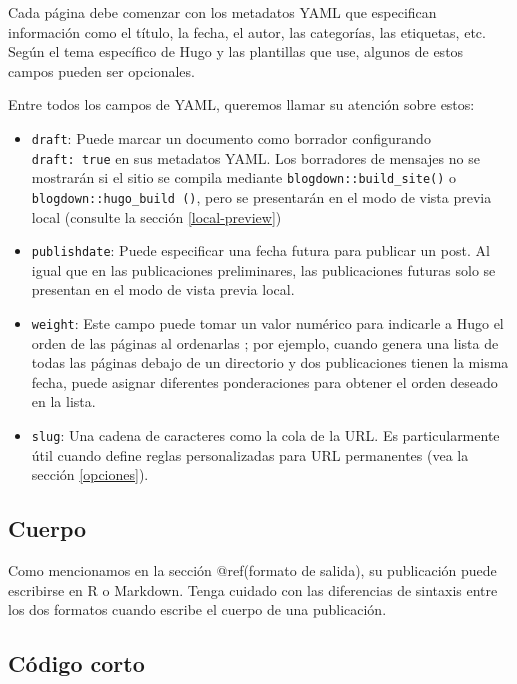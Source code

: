 \documentclass[12pt,]{krantz}
\theoremstyle{definition}
\theoremstyle{definition}
\theoremstyle{definition}
\theoremstyle{remark}
\begin{document}
Cada página debe comenzar con los metadatos YAML que
especifican información como el título, la fecha, el autor, las
categorías, las etiquetas, etc. Según el tema específico de Hugo y las
plantillas que use, algunos de estos campos pueden ser opcionales.

Entre todos los campos de YAML, queremos llamar su atención sobre estos:

\begin{itemize}
\item
  \texttt{draft}: Puede marcar un documento como
  borrador configurando \texttt{draft:\ true} en sus
  metadatos YAML. Los borradores de mensajes no se mostrarán si el sitio
  se compila mediante \texttt{blogdown::build\_site()} o
  \texttt{blogdown::hugo\_build\ ()}, pero se presentarán en el modo de
  vista previa local (consulte la sección \ref{local-preview})
\item
  \texttt{publishdate}: Puede especificar una fecha futura
   para publicar un post. Al igual que en las
  publicaciones preliminares, las publicaciones futuras solo se
  presentan en el modo de vista previa local.
\item
  \texttt{weight}: Este campo puede tomar un valor numérico para
  indicarle a Hugo el orden de las páginas al ordenarlas
  ; por ejemplo, cuando genera una lista de todas
  las páginas debajo de un directorio y dos publicaciones tienen la
  misma fecha, puede asignar diferentes ponderaciones para obtener el
  orden deseado en la lista.
\item
  \texttt{slug}: Una cadena de caracteres como la cola de la URL. Es
  particularmente útil cuando define reglas personalizadas para URL
  permanentes (vea la sección \ref{opciones}).
\end{itemize}

\hypertarget{cuerpo}{%
\subsection{Cuerpo}\label{cuerpo}}

Como mencionamos en la sección @ref(formato de salida), su publicación
puede escribirse en R o Markdown. Tenga cuidado con las diferencias de
sintaxis entre los dos formatos cuando escribe el cuerpo de una
publicación.

\hypertarget{codigo-corto}{%
\subsection{Código corto}\label{codigo-corto}}
\end{document}
